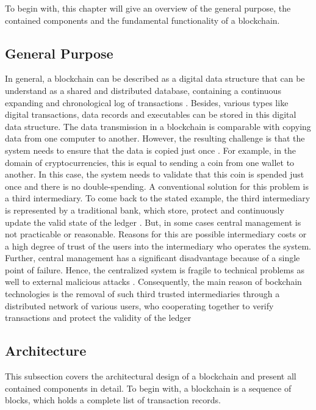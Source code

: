 To begin with, this chapter will give an overview of the general purpose, the contained components and the fundamental functionality of a blockchain. 

\subsection{General Purpose}
In general, a blockchain can be described as a digital data structure that can be understand as a shared and distributed database, containing a continuous expanding and chronological log of transactions \cite{andoni2019blockchain}. Besides, various types like digital transactions, data records and executables can be stored in this digital data structure. The data transmission in a blockchain is comparable with copying data from one computer to another. However, the resulting challenge is that the system needs to ensure that the data is copied just once \cite{andoni2019blockchain}. For example, in the domain of cryptocurrencies, this is equal to sending a coin from one wallet to another. In this case, the system needs to validate that this coin is spended just once and there is no double-spending. A conventional solution for this problem is a third intermediary. To come back to the stated example, the third intermediary is represented by a traditional bank, which store, protect and continuously update the valid state of the ledger \cite{andoni2019blockchain}. But, in some cases central management is not practicable or reasonable. Reasons for this are possible intermediary costs or a high degree of trust of the users into the intermediary who operates the system. Further, central management has a significant disadvantage because of a single point of failure. Hence, the centralized system is fragile to technical problems as well to external malicious attacks \cite{andoni2019blockchain}.
Consequently, the main reason of bockchain technologies is the removal of such third trusted intermediaries through a distributed network of various users, who cooperating together to verify transactions and protect the validity of the ledger

\subsection{Architecture}
This subsection covers the architectural design of a blockchain and present all contained components in detail. To begin with, a blockchain is a sequence of blocks, which holds a complete list of transaction records.


